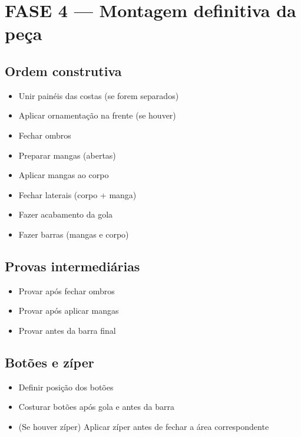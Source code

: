 \documentclass[
  brazilian,
  8pt,
  oneside]{book}
\providecommand{\tightlist}{%
  \setlength{\itemsep}{0pt}\setlength{\parskip}{0pt}}
\begin{document}
\section{FASE 4 --- Montagem definitiva da peça}\label{fase-4-montagem-definitiva-da-peuxe7a}

\subsection{Ordem construtiva}\label{ordem-construtiva}

\begin{itemize}
\tightlist
\item[$\square$]
  Unir painéis das costas (se forem separados)
\item[$\square$]
  Aplicar ornamentação na frente (se houver)
\item[$\square$]
  Fechar ombros
\item[$\square$]
  Preparar mangas (abertas)
\item[$\square$]
  Aplicar mangas ao corpo
\item[$\square$]
  Fechar laterais (corpo + manga)
\item[$\square$]
  Fazer acabamento da gola
\item[$\square$]
  Fazer barras (mangas e corpo)
\end{itemize}

\subsection{Provas intermediárias}\label{provas-intermediuxe1rias}

\begin{itemize}
\tightlist
\item[$\square$]
  Provar após fechar ombros
\item[$\square$]
  Provar após aplicar mangas
\item[$\square$]
  Provar antes da barra final
\end{itemize}

\subsection{Botões e zíper}\label{botuxf5es-e-zuxedper}

\begin{itemize}
\tightlist
\item[$\square$]
  Definir posição dos botões
\item[$\square$]
  Costurar botões após gola e antes da barra
\item[$\square$]
  (Se houver zíper) Aplicar zíper antes de fechar a área correspondente
\end{itemize}
\end{document}
